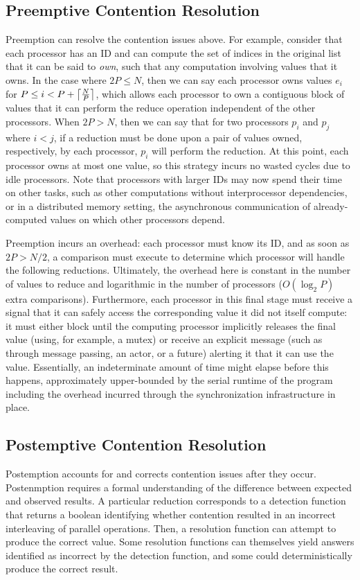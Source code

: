 \subsection{Preemptive Contention Resolution}
Preemption can resolve the contention issues above. For example, consider that
each processor has an ID and can compute the set of indices in the original list
that it can be said to \emph{own}, such that any computation involving values
that it owns. In the case where $2P \leq N$, then we can say each processor owns
values $e_i$ for $P \leq i < P + \ceil*{\frac{N}{P}}$, which allows each
processor to own a contiguous block of values that it can perform the reduce
operation independent of the other processors. When $2P > N$, then we can say
that for two processors $p_i$ and $p_j$ where $i < j$, if a reduction must be
done upon a pair of values owned, respectively, by each processor, $p_i$ will
perform the reduction. At this point, each processor owns at most one value, so
this strategy incurs no wasted cycles due to idle processors. Note that
processors with larger IDs may now spend their time on other tasks, such as
other computations without interprocessor dependencies, or in a distributed
memory setting, the asynchronous communication of already-computed values on
which other processors depend.

Preemption incurs an overhead: each processor must know its ID, and as soon as
$2P > N/2$, a comparison must execute to determine which processor will handle
the following reductions. Ultimately, the overhead here is constant in the number
of values to reduce and logarithmic in the number of processors ($O(\log_2 P)$
extra comparisons). Furthermore, each processor in this final stage must receive
a signal that it can safely access the corresponding value it did not itself
compute: it must either block until the computing processor implicitly releases
the final value (using, for example, a mutex) or receive an explicit message
(such as through message passing, an actor, or a future) alerting it that it can
use the value. Essentially, an indeterminate amount of time might elapse before
this happens, approximately upper-bounded by the serial runtime of the program
including the overhead incurred through the synchronization infrastructure in
place.

\subsection{Postemptive Contention Resolution}
Postemption accounts for and corrects contention issues after they occur.
Postenmption requires a formal understanding of the difference between expected
and observed results. A particular reduction corresponds to a detection function
that returns a boolean identifying whether contention resulted in an incorrect
interleaving of parallel operations. Then, a resolution function can attempt to
produce the correct value. Some resolution functions can themselves yield
answers identified as incorrect by the detection function, and some could
deterministically produce the correct result.

